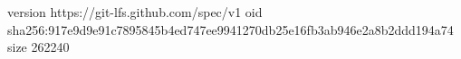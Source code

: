version https://git-lfs.github.com/spec/v1
oid sha256:917e9d9e91c7895845b4ed747ee9941270db25e16fb3ab946e2a8b2ddd194a74
size 262240
